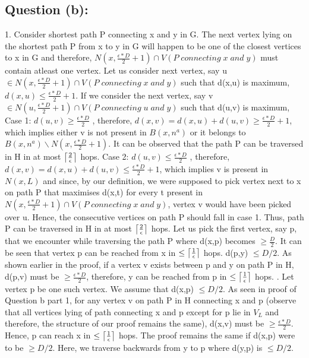 \documentclass[12pt]{article}
\DeclarePairedDelimiter\ceil{\lceil}{\rceil}
\begin{document}
\subsection{Question (b):}
1. Consider shortest path P connecting x and y in G. 
The next vertex lying on the shortest path P from
x to y in G will happen to be one of the closest vertices to x in G and
therefore, $ N(x,\frac{\epsilon*D} {2} + 1) \cap V(P \;
connecting \; x \; and \; y)$ must contain atleast one vertex.
Let us consider next vertex, say u $\in N(x,\frac{\epsilon*D} {2} + 1) \cap V(P \;
connecting \; x \; and \; y)$ such that d(x,u) is maximum,
$d(x,u) \le \frac{\epsilon*D} {2} + 1$. 
If we consider
the next vertex, say v $\in N(u,\frac{\epsilon*D} {2} + 1) \cap V(P \;
connecting \; u \; and \; y)$ such that d(u,v) is 
maximum,  
Case 1: $d(u,v) \ge \frac{\epsilon*D} {2}$ , therefore, 
$d(x,v) = d(x,u)+d(u,v) \ge \frac{\epsilon*D} {2} +1$, which implies 
either v is not present in $B(x,n^a)$ or it belongs to 
$B(x,n^a) \backslash N(x,\frac{\epsilon*D} {2} + 1)$. It can
be observed that the path P can be traversed in H in at most
$\ceil* {\frac {2}{\epsilon}} $ hops. Case 2: $d(u,v) \le \frac{\epsilon*D} {2}$ , therefore, 
$d(x,v) = d(x,u)+d(u,v) \le \frac{\epsilon*D} {2} +1$, which implies 
v is present in $N(x,L)$ and since, by our definition, we were supposed
to pick vertex next to x on path P that maximises d(x,t) for every t present in
$ N(x,\frac{\epsilon*D} {2} + 1) \cap V(P \;
connecting \; x \; and \; y)$, vertex v would have been picked
over u. Hence, the consecutive vertices on path P should fall in case 1. Thus, path P can be traversed in H in at most
$\ceil* {\frac {2}{\epsilon}} $ hops. Let us pick the first vertex,
say p, that we encounter while traversing the path P where
d(x,p) becomes $\ge \frac {D} {2}$. It can be seen that vertex p
can be reached from x in $\le \ceil* {\frac {1}{\epsilon}}$ hops.
d(p,y) $\le D/2$. As shown earlier in the proof, if a vertex v exists
between p and y on path P in H, d(p,v) must be $\ge \frac{\epsilon*D} {2}$, 
therefore, y can be reached from p in $\le \ceil* {\frac {1}{\epsilon}}$ hops.
\newline
{}. Let vertex p be one such vertex. We assume that d(x,p) $\le D/2$.
As seen in proof of Question b part 1, for any vertex v on path
P in H connecting x and p (observe that all vertices lying of path 
connecting x and p except for p lie in $V_L$ and therefore, the
structure of our proof remains the same), d(x,v) must be $\ge \frac{\epsilon*D} {2}$.
Hence, p can reach x in $\le \ceil* {\frac {1}{\epsilon}}$ hops.
The proof remains the same if d(x,p) were to be $\ge D/2$. Here, we 
traverse backwards from y to p where d(y,p) is $\le D/2$.
\end{document}
